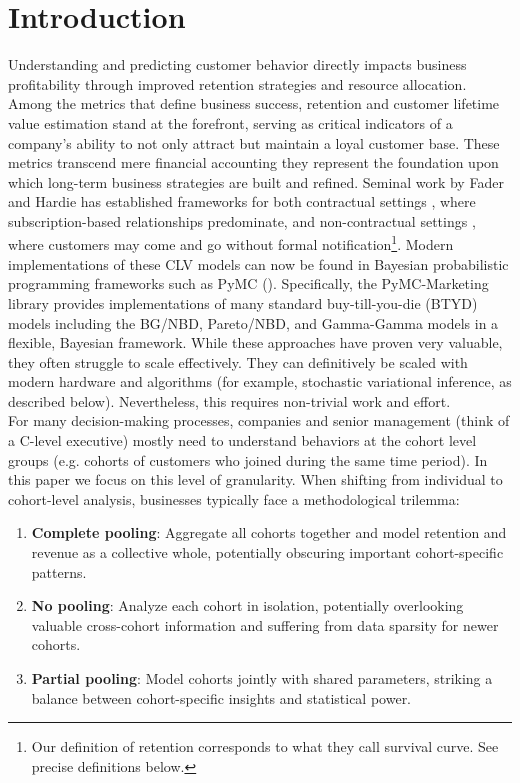 \documentclass[11pt]{amsart}
\theoremstyle{definition}
\begin{document}
\section{Introduction}
Understanding and predicting customer behavior directly impacts business profitability through improved retention strategies
and resource allocation. Among the metrics that define business success, retention and customer lifetime value
estimation stand at the forefront, serving as critical indicators of a company's ability to not only attract but maintain a
loyal customer base. These metrics transcend mere financial accounting they represent the foundation upon which long-term
business strategies are built and refined. Seminal work by Fader and Hardie has established frameworks for both contractual
settings \cite{FaderHardie2007}, where subscription-based relationships predominate, and non-contractual settings
\cite{FaderHardie2005}, where customers may come and go without formal notification\footnote{Our definition of retention
    corresponds to what they call survival curve. See precise definitions below.}. Modern implementations of these CLV
models can now be found in Bayesian probabilistic programming frameworks such as PyMC (\cite{pymc2023}). Specifically, the
PyMC-Marketing library \cite{pymc_marketing} provides implementations of many standard buy-till-you-die (BTYD) models including
the BG/NBD, Pareto/NBD, and Gamma-Gamma models in a flexible, Bayesian framework. While these approaches have proven very valuable, they
often struggle to scale effectively. They can definitively be scaled with modern hardware and algorithms (for example,
stochastic variational inference, as described below). Nevertheless, this requires non-trivial work and effort.\\

For many decision-making processes, companies and senior management (think of a C-level executive) mostly need to understand
behaviors at the cohort level groups (e.g. cohorts of customers who joined during the same time period). In this paper we
focus on this level of granularity. When shifting from individual to cohort-level analysis, businesses typically face a
methodological trilemma:

\begin{enumerate}
    \item \textbf{Complete pooling}: Aggregate all cohorts together and model retention and revenue as a collective whole,
          potentially obscuring important cohort-specific patterns.

    \item \textbf{No pooling}: Analyze each cohort in isolation, potentially overlooking valuable cross-cohort information
          and suffering from data sparsity for newer cohorts.

    \item \textbf{Partial pooling}: Model cohorts jointly with shared parameters, striking a balance between cohort-specific
          insights and statistical power.
\end{enumerate}
\end{document}
